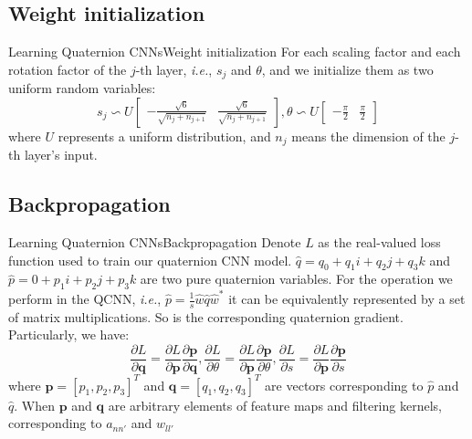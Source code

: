 \documentclass{beamer}
\begin{document}
\subsection{Weight initialization}
\begin{frame}{Learning Quaternion CNNs}{Weight initialization}
For each scaling factor and each rotation factor of the $j$-th layer,
\emph{i.e.}, $s_j$ and $\theta$, and we initialize them as two uniform random variables:
\begin{equation}
    s_j \backsim U
    \begin{bmatrix}
        -\frac{\sqrt{6}}
        {\sqrt{n_j+n_{j+1}}}& \frac{\sqrt{6}}{\sqrt{n_j+n_{j+1}}}
    \end{bmatrix}
    ,
    \theta\backsim U
    \begin{bmatrix}
        -\frac{\pi}{2}&\frac{\pi}{2}
    \end{bmatrix}
\end{equation}
where $U$ represents a uniform distribution, and $n_j$ means the dimension of the
$j$-th layer's input.
\end{frame}

\subsection{Backpropagation}
\begin{frame}{Learning Quaternion CNNs}{Backpropagation}
Denote $L$ as the real-valued loss function used to train our quaternion CNN model. $\hat{q}=q_0+q_1i+q_2j+q_3k$ and $\hat{p}= 0 + p_1i + p_2j + p_3k$ are two pure quaternion variables. For the operation we perform in the QCNN, \emph{i.e.}, $\hat{p}=\frac{1}{s}\hat{w}\hat{q}\hat{w}^*$ it can be equivalently represented by a set of matrix multiplications. So is the corresponding quaternion gradient. Particularly, we have:
\begin{equation}
    \frac{\partial L}{\partial \textbf{q}}=\frac{\partial L}{\partial \textbf{p}}\frac{\partial \textbf{p}}{\partial \textbf{q}}, \frac{\partial L}{\partial \theta}=\frac{\partial L}{\partial \textbf{p}}\frac{\partial \textbf{p}}{\partial \theta}, \frac{\partial L}{\partial s}=\frac{\partial L}{\partial \textbf{p}}\frac{\partial \textbf{p}}{\partial s}
\end{equation}
where $\mathbf{p}=[p_1,p_2,p_3]^T$ and $\mathbf{q}=[q_1,q_2,q_3]^T$ are vectors corresponding to $\hat{p}$ and $\hat{q}$. When $\mathbf{p}$  and $\mathbf{q}$  are arbitrary elements of feature maps and filtering kernels,
corresponding to $a_{nn'}$ and $w_{ll'}$
\end{frame}
\end{document}
